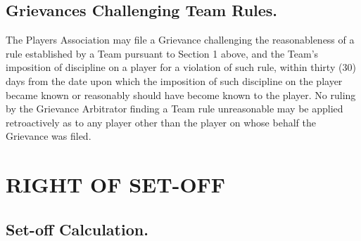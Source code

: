 \documentclass[
]{book}
\begin{document}
\hypertarget{grievances-challenging-team-rules.}{%
\section{Grievances Challenging Team Rules.}\label{grievances-challenging-team-rules.}}

The Players Association may file a Grievance challenging the reasonableness of a rule established by a Team pursuant to Section 1 above, and the Team's imposition of discipline on a player for a violation of such rule, within thirty (30) days from the date upon which the imposition of such discipline on the player became known or reasonably should have become known to the player. No ruling by the Grievance Arbitrator finding a Team rule unreasonable may be applied retroactively as to any player other than the player on whose behalf the Grievance was filed.

\hypertarget{right-of-set-off}{%
\chapter{RIGHT OF SET-OFF}\label{right-of-set-off}}

\hypertarget{set-off-calculation.}{%
\section{Set-off Calculation.}\label{set-off-calculation.}}
\end{document}

